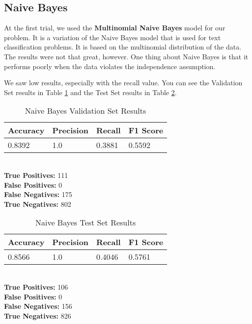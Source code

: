 \documentclass[conference]{IEEEtran}
\begin{document}
\subsection{Naive Bayes}
At the first trial, we used the \textbf{Multinomial Naive Bayes} model for our problem. It is a variation of the Naive Bayes model that is used for text classification problems. It is based on the multinomial distribution of the data. The results were not that great, however. One thing about Naive Bayes is that it performs poorly when the data violates the independence assumption.

We saw low results, especially with the recall value. You can see the Validation Set results in Table \ref{tab:nb1} and the Test Set results in Table \ref{tab:nb2}.

\begin{table}[H]
    \caption{Naive Bayes Validation Set Results}

    \begin{tabularx}{\linewidth}{|X|X|X|X|}
        \hline
        \textbf{Accuracy} & \textbf{Precision} & \textbf{Recall} & \textbf{F1 Score} \\
        \hline
        0.8392 & 1.0 & 0.3881 & 0.5592 \\
        \hline
    \end{tabularx}\\

    \textbf{True Positives:} 111\\
    \textbf{False Positives:} 0\\
    \textbf{False Negatives:} 175\\
    \textbf{True Negatives:} 802
    \label{tab:nb1}
\end{table}

\begin{table}[H]
    \caption{Naive Bayes Test Set Results}

    \begin{tabularx}{\linewidth}{|X|X|X|X|}
        \hline
        \textbf{Accuracy} & \textbf{Precision} & \textbf{Recall} & \textbf{F1 Score} \\
        \hline
        0.8566 & 1.0 & 0.4046 & 0.5761 \\
        \hline
    \end{tabularx}\\

    \textbf{True Positives:} 106\\
    \textbf{False Positives:} 0\\
    \textbf{False Negatives:} 156\\
    \textbf{True Negatives:} 826
    \label{tab:nb2}
\end{table}
\end{document}
